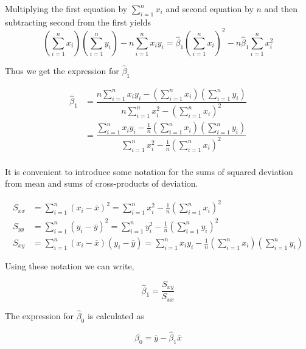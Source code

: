 \documentclass[twoside]{book}
\begin{document}
Multiplying the first equation by $\sum_{i=1}^n x_i$ and second equation by $n$ and then subtracting second from the first yields
$$\left(\sum_{i=1}^{n} x_i\right)\left(\sum_{i=1}^{n} y_i\right) - n\sum_{i=1}^{n} x_i y_i = \hat{\beta}_1\left(\sum_{i=1}^{n} x_i\right)^2 - n\hat{\beta}_1\sum_{i=1}^{n} x_i^2  $$

Thus we get the expression for $\hat{\beta}_1$

\begin{align*}
    \hat{\beta}_1 &= \dfrac{n\sum_{i=1}^{n} x_i y_i-\left(\sum_{i=1}^{n} x_i\right)\left(\sum_{i=1}^{n} y_i\right)}{n\sum_{i=1}^{n} x_i^2-\left(\sum_{i=1}^{n} x_i\right)^2} \\
    &= \dfrac{\sum_{i=1}^{n} x_i y_i-\frac{1}{n}\left(\sum_{i=1}^{n} x_i\right)\left(\sum_{i=1}^{n} y_i\right)}{\sum_{i=1}^{n} x_i^2-\frac{1}{n}\left(\sum_{i=1}^{n} x_i\right)^2} \\
\end{align*}

It is convenient to introduce some notation for the sums of squared deviation from mean and sums of cross-products of deviation.

\begin{textbox}
\begin{align*}
S_{xx} &= \sum_{i=1}^{n} (x_i - \overline{x})^2 = \sum_{i=1}^{n} x_i^2 - \frac{1}{n}\left( \sum_{i=1}^{n} x_i \right)^2 \\
S_{yy} &= \sum_{i=1}^{n} (y_i - \overline{y})^2 = \sum_{i=1}^{n} y_i^2 - \frac{1}{n}\left( \sum_{i=1}^{n} y_i \right)^2 \\
S_{xy} &= \sum_{i=1}^{n} (x_i - \overline{x})(y_i - \overline{y}) = \sum_{i=1}^{n} x_i y_i - \frac{1}{n}\left( \sum_{i=1}^{n} x_i \right) \left( \sum_{i=1}^{n} y_i \right)
\end{align*}
\end{textbox}

Using these notation we can write,
\begin{textbox}
$$\hat{\beta}_1 = \dfrac{S_{xy}}{S_{xx}}$$
\end{textbox}
The expression for $\hat{\beta}_0$ is calculated as
\begin{textbox}
\[
\hat{\beta}_0 = \overline{y} - \hat{\beta}_1 \overline{x}
\]
\end{textbox}
\end{document}
